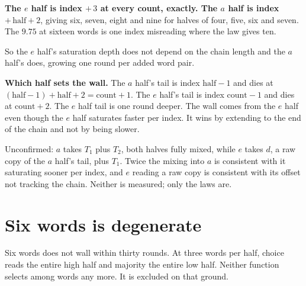 \textbf{The \(e\) half is index \(+\,3\) at every count, exactly. The \(a\) half is index \(+\, \mathrm{half} + 2\)}, giving six, seven, eight and nine for halves of four, five, six and seven. The \(9.75\) at sixteen words is one index misreading where the law gives ten.

So the \(e\) half's saturation depth does not depend on the chain length and the \(a\) half's does, growing one round per added word pair.

\textbf{Which half sets the wall.} The \(a\) half's tail is index \(\mathrm{half}-1\) and dies at \((\mathrm{half}-1) + \mathrm{half} + 2 = \mathrm{count} + 1\). The \(e\) half's tail is index \(\mathrm{count}-1\) and dies at \(\mathrm{count} + 2\). The \(e\) half tail is one round deeper. The wall comes from the \(e\) half even though the \(e\) half saturates faster per index. It wins by extending to the end of the chain and not by being slower.

Unconfirmed: \(a\) takes \(T_1\) plus \(T_2\), both halves fully mixed, while \(e\) takes \(d\), a raw copy of the \(a\) half's tail, plus \(T_1\). Twice the mixing into \(a\) is consistent with it saturating sooner per index, and \(e\) reading a raw copy is consistent with its offset not tracking the chain. Neither is measured; only the laws are.

\section{Six words is degenerate}

Six words does not wall within thirty rounds. At three words per half, choice reads the entire high half and majority the entire low half. Neither function selects among words any more. It is excluded on that ground.
